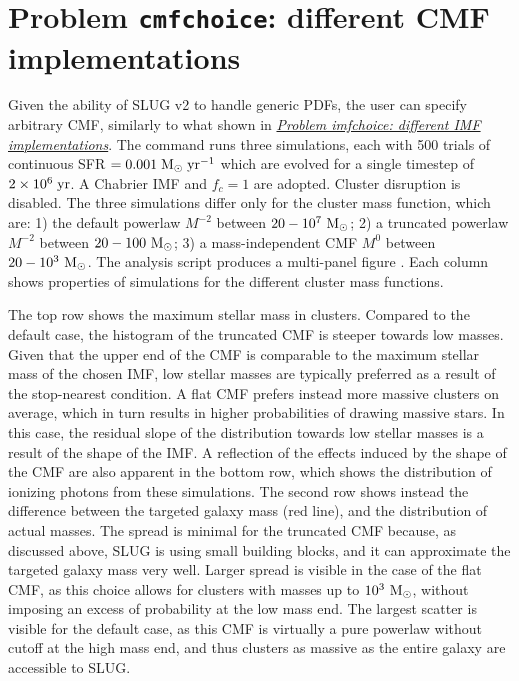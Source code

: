 \documentclass[letterpaper,10pt,english]{sphinxmanual}
\begin{document}
\section{Problem \texttt{cmfchoice}: different CMF implementations}
\label{tests:problem-cmfchoice-different-cmf-implementations}
Given the ability of SLUG v2 to handle generic PDFs, the user can specify arbitrary CMF,
similarly to what shown in  {\hyperref[tests:probimf-label]{\emph{Problem imfchoice: different IMF implementations}}}.
The command   runs three  simulations, each with 500 trials
of continuous  SFR \(=0.001\rm\;M_\odot\;yr^{-1}\) which are evolved for a
single timestep of  \(2\times 10^6\rm\;yr\). A Chabrier IMF and \(f_c=1\)
are adopted. Cluster disruption is disabled. The three simulations
differ only for the cluster mass function, which are:
1) the default powerlaw \(M^{-2}\) between \(20-10^{7}~\rm M_\odot\);
2) a truncated powerlaw \(M^{-2}\) between \(20-100~\rm M_\odot\);
3) a mass-independent CMF \(M^{0}\) between \(20-10^3~\rm M_\odot\).
The analysis script  produces a multi-panel figure
. Each column shows properties of simulations for the different
cluster mass functions.

The top row shows the maximum stellar mass in clusters. Compared to the default case,
the histogram of the truncated CMF is steeper towards low masses. Given that the upper end of the
CMF is comparable to the maximum stellar mass of the chosen IMF, low stellar masses are typically
preferred  as a result of the stop-nearest condition. A flat CMF
prefers instead more massive clusters on average, which in turn results in higher probabilities
of drawing massive stars. In this case, the residual slope of the distribution towards
low stellar masses is a result of the shape of the IMF. A reflection of the effects induced by the
shape of the CMF are also apparent in the bottom row, which shows the distribution of
ionizing photons from these simulations. The second row shows instead the difference
between the targeted galaxy mass (red line), and the distribution of actual masses.
The spread is minimal for the truncated CMF because, as discussed above, SLUG is using
small building blocks, and it can approximate the targeted galaxy mass very well.
Larger spread is visible in the case of the flat CMF, as this choice allows for clusters with masses
up to \(10^3~\rm M_\odot\), without imposing an excess of probability at the low
mass end. The largest scatter is visible for the default case, as this CMF is virtually
a pure powerlaw without cutoff at the high mass end, and thus clusters as massive as the entire galaxy
are accessible to SLUG.
\end{document}
